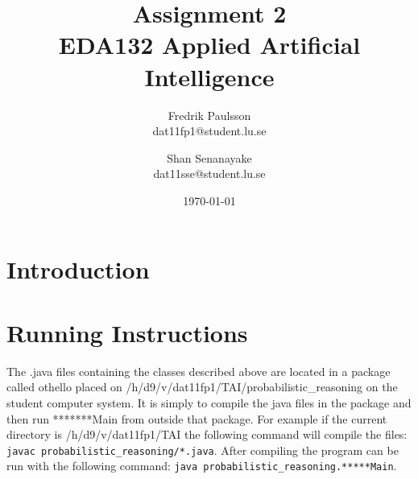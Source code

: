 \documentclass[a4paper]{article}
\title{Assignment 2 \\ EDA132 Applied Artificial Intelligence}
\date{\today}
\author{Fredrik Paulsson \\ dat11fp1@student.lu.se \and Shan Senanayake \\ dat11sse@student.lu.se}
\begin{document}
\maketitle


\section{Introduction}

\section{Running Instructions}
The .java files containing the classes described above are located in a package called othello placed on /h/d9/v/dat11fp1/TAI/probabilistic\_reasoning on the student computer system. It is simply to compile the java files in the package and then run *******Main from outside that package. For example if the current directory is /h/d9/v/dat11fp1/TAI the following command will compile the files: \texttt{javac probabilistic\_reasoning/*.java}. After compiling the program can be run with the following command: \texttt{java probabilistic\_reasoning.*****Main}.

\end{document}
